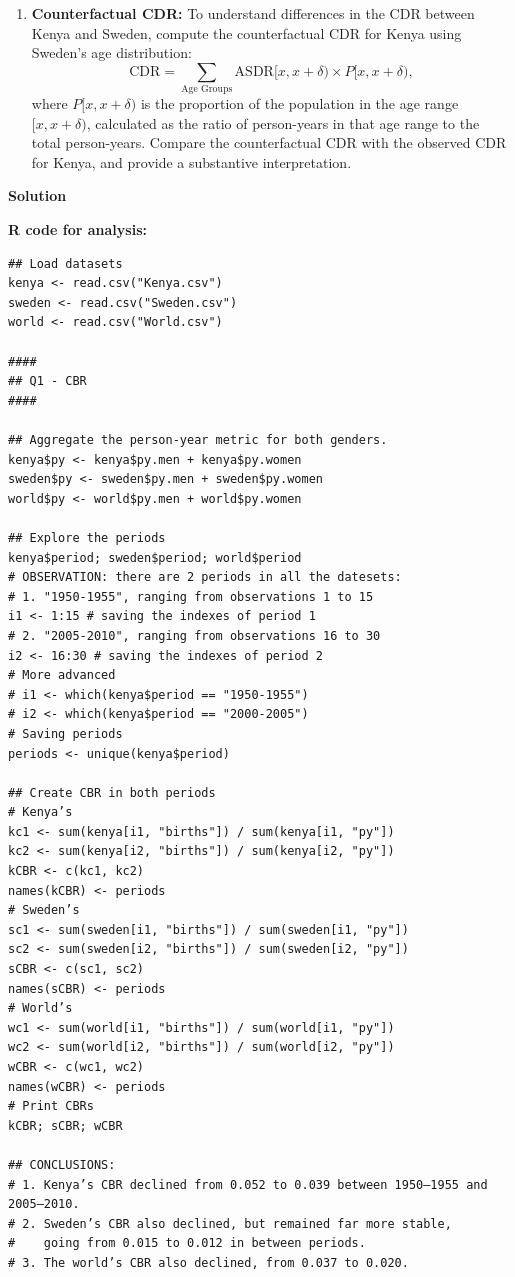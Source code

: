 \documentclass[12pt]{article}
\begin{document}
\begin{enumerate}
    \item \textbf{Counterfactual CDR:} To understand differences in the CDR between Kenya and Sweden, compute the counterfactual CDR for Kenya using Sweden’s age distribution:
    \[
    \text{CDR} = \sum_{\text{Age Groups}} \text{ASDR}[x, x+\delta) \times P[x, x+\delta),
    \]
    where $P[x, x+\delta)$ is the proportion of the population in the age range $[x, x+\delta)$, calculated as the ratio of person-years in that age range to the total person-years. Compare the counterfactual CDR with the observed CDR for Kenya, and provide a substantive interpretation.
\end{enumerate}

{\color{blue}
\begin{center}
    \textbf{\large Solution}    
\end{center}

\textbf{R code for analysis:}

\begin{verbatim}
## Load datasets
kenya <- read.csv("Kenya.csv")
sweden <- read.csv("Sweden.csv")
world <- read.csv("World.csv")

####
## Q1 - CBR
####

## Aggregate the person-year metric for both genders.
kenya$py <- kenya$py.men + kenya$py.women
sweden$py <- sweden$py.men + sweden$py.women
world$py <- world$py.men + world$py.women

## Explore the periods 
kenya$period; sweden$period; world$period
# OBSERVATION: there are 2 periods in all the datesets:
# 1. "1950-1955", ranging from observations 1 to 15
i1 <- 1:15 # saving the indexes of period 1
# 2. "2005-2010", ranging from observations 16 to 30
i2 <- 16:30 # saving the indexes of period 2
# More advanced
# i1 <- which(kenya$period == "1950-1955")
# i2 <- which(kenya$period == "2000-2005")
# Saving periods
periods <- unique(kenya$period)

## Create CBR in both periods
# Kenya’s
kc1 <- sum(kenya[i1, "births"]) / sum(kenya[i1, "py"])
kc2 <- sum(kenya[i2, "births"]) / sum(kenya[i2, "py"])
kCBR <- c(kc1, kc2)
names(kCBR) <- periods
# Sweden’s
sc1 <- sum(sweden[i1, "births"]) / sum(sweden[i1, "py"])
sc2 <- sum(sweden[i2, "births"]) / sum(sweden[i2, "py"])
sCBR <- c(sc1, sc2)
names(sCBR) <- periods
# World’s
wc1 <- sum(world[i1, "births"]) / sum(world[i1, "py"])
wc2 <- sum(world[i2, "births"]) / sum(world[i2, "py"])
wCBR <- c(wc1, wc2)
names(wCBR) <- periods
# Print CBRs
kCBR; sCBR; wCBR

## CONCLUSIONS: 
# 1. Kenya’s CBR declined from 0.052 to 0.039 between 1950–1955 and 2005–2010.
# 2. Sweden’s CBR also declined, but remained far more stable, 
#    going from 0.015 to 0.012 in between periods.
# 3. The world’s CBR also declined, from 0.037 to 0.020.


\end{verbatim}}
\end{document}
